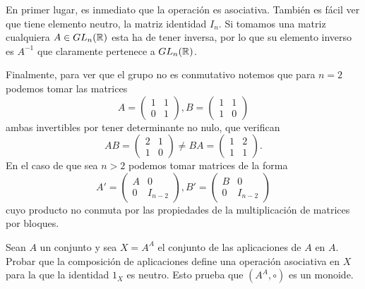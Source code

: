 \begin{proofbox}
    En primer lugar, es inmediato que la operación es asociativa. También es fácil ver que tiene elemento neutro, la matriz identidad $I_n$. Si tomamos una matriz cualquiera $A\in GL_n(\mathbb{R})$ esta ha de tener inversa, por lo que su elemento inverso es $A^{-1}$ que claramente pertenece a $GL_n(\mathbb{R})$.

    Finalmente, para ver que el grupo no es conmutativo notemos que para $n=2$ podemos tomar las matrices
    \[
    A = \begin{pmatrix} 1 & 1 \\ 0 & 1 \end{pmatrix}, B = \begin{pmatrix} 1 & 1 \\ 1 & 0 \end{pmatrix}
    \]
    ambas invertibles por tener determinante no nulo, que verifican
    \[
    AB = \begin{pmatrix} 2 & 1 \\ 1 & 0 \end{pmatrix} \neq BA = \begin{pmatrix} 1 & 2 \\ 1 & 1 \end{pmatrix}.
    \]
    En el caso de que sea $n > 2$ podemos tomar matrices de la forma
    \[
    A' = \begin{pmatrix} A & 0 \\ 0 & I_{n-2} \end{pmatrix}, B' = \begin{pmatrix} B & 0 \\ 0 & I_{n-2} \end{pmatrix}
    \]
    cuyo producto no conmuta por las propiedades de la multiplicación de matrices por bloques.
\end{proofbox}

\begin{example}{}{}
    Sean $A$ un conjunto y sea $X=A^{A}$ el conjunto de las aplicaciones de $A$ en $A$. Probar que la composición de aplicaciones define una operación asociativa en $X$ para la que la identidad $1_{X}$ es neutro. Esto prueba que $(A^{A},\circ)$ es un monoide.
\end{example}

